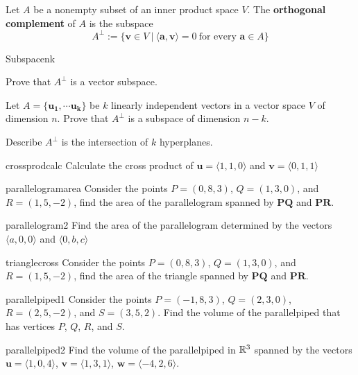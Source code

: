 \begin{definition}
    Let $A$ be a nonempty subset of an inner product space $V$.  The \textbf{orthogonal complement} of $A$ is the subspace
    $$A^\bot := \{\bm{v} \in V \ | \ \langle \bm{a}, \bm{v} \rangle = 0 \ \text{for every } \bm{a} \in A \}$$
    \end{definition}

\begin{problem}{Subspacenk}
    
    
    Prove that $A^\bot$ is a vector subspace.  
    
    
    Let $A = \{\bm{u_1}, \cdots \bm{u_k}\}$ be $k$ linearly independent vectors in a vector space $V$ of dimension $n$. Prove that $A^\bot$ is a subspace of dimension $n-k$.
    
    Describe $A^\bot$ is the intersection of $k$ hyperplanes.
    
\end{problem}

\begin{problem}{crossprodcalc}
    Calculate the cross product of $\bm{u} = \langle 1,1,0\rangle$ and $\bm{v} = \langle 0,1,1\rangle$
\end{problem}

\begin{problem}{parallelogramarea}
    Consider the points $P= (0,8,3)$, $Q= (1,3,0)$, and $R= (1,5,-2)$, find the area of the parallelogram spanned by   $\bm{PQ}$ and  $\bm{PR}$.
\end{problem}

\begin{problem}{parallelogram2}
    Find the area of the parallelogram determined by the vectors $\langle a, 0, 0\rangle$ and $\langle 0, b, c\rangle$
\end{problem}

\begin{problem}{trianglecross}
    Consider the points $P= (0,8,3)$, $Q= (1,3,0)$, and $R= (1,5,-2)$, find the area of the triangle spanned by   $\bm{PQ}$ and  $\bm{PR}$.
\end{problem}

\begin{problem}{parallelpiped1}
    Consider the points $P= (-1,8,3)$, $Q= (2,3,0)$, $R= (2,5,-2)$, and $S = (3,5,2)$. Find the volume of the parallelpiped that has vertices $P$, $Q$, $R$, and $S$.
    
\end{problem}

\begin{problem}{parallelpiped2}
    Find the volume of the parallelpiped in $\mathbb{R}^3$ spanned by the vectors $\bm{u} =\langle 1, 0,4 \rangle$, $\bm{v} = \langle 1, 3, 1 \rangle$, $\bm{w} = \langle -4, 2, 6 \rangle$.
\end{problem}

